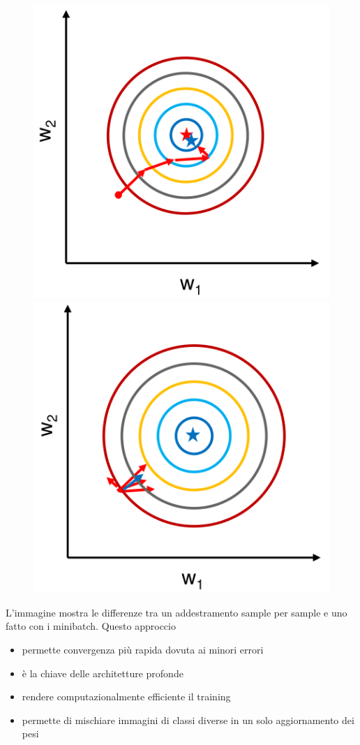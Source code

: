 \begin{figure}
	\vspace{-1.2cm}
	\centering
	\includegraphics[width=.9\linewidth]{Picture/Batch_Training1}
	\includegraphics[width=.9\linewidth]{Picture/Batch_Training2}
\end{figure}
\vspace{.5cm}
L'immagine mostra le differenze tra un addestramento sample per sample e uno fatto con i minibatch. Questo approccio
\begin{itemize}
	\item permette convergenza più rapida dovuta ai minori errori
	\item è la chiave delle architetture profonde
	\item rendere computazionalmente efficiente il training
	\item permette di mischiare immagini di classi diverse in un solo aggiornamento dei pesi
\end{itemize}

